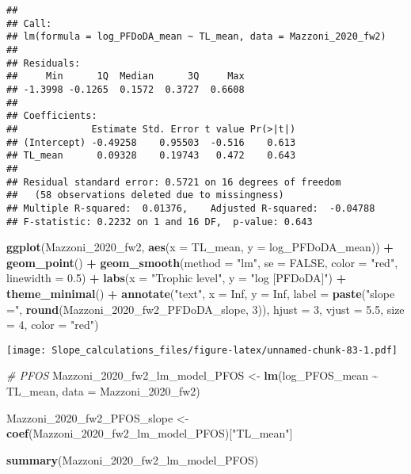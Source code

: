 \documentclass[
]{article}
\newenvironment{Shaded}{\begin{snugshade}}{\end{snugshade}}
\newcommand{\AttributeTok}[1]{\textcolor[rgb]{0.13,0.29,0.53}{#1}}
\newcommand{\CommentTok}[1]{\textcolor[rgb]{0.56,0.35,0.01}{\textit{#1}}}
\newcommand{\ConstantTok}[1]{\textcolor[rgb]{0.56,0.35,0.01}{#1}}
\newcommand{\DecValTok}[1]{\textcolor[rgb]{0.00,0.00,0.81}{#1}}
\newcommand{\FloatTok}[1]{\textcolor[rgb]{0.00,0.00,0.81}{#1}}
\newcommand{\FunctionTok}[1]{\textcolor[rgb]{0.13,0.29,0.53}{\textbf{#1}}}
\newcommand{\NormalTok}[1]{#1}
\newcommand{\OtherTok}[1]{\textcolor[rgb]{0.56,0.35,0.01}{#1}}
\newcommand{\SpecialCharTok}[1]{\textcolor[rgb]{0.81,0.36,0.00}{\textbf{#1}}}
\newcommand{\StringTok}[1]{\textcolor[rgb]{0.31,0.60,0.02}{#1}}
\begin{document}
\begin{verbatim}
## 
## Call:
## lm(formula = log_PFDoDA_mean ~ TL_mean, data = Mazzoni_2020_fw2)
## 
## Residuals:
##     Min      1Q  Median      3Q     Max 
## -1.3998 -0.1265  0.1572  0.3727  0.6608 
## 
## Coefficients:
##             Estimate Std. Error t value Pr(>|t|)
## (Intercept) -0.49258    0.95503  -0.516    0.613
## TL_mean      0.09328    0.19743   0.472    0.643
## 
## Residual standard error: 0.5721 on 16 degrees of freedom
##   (58 observations deleted due to missingness)
## Multiple R-squared:  0.01376,    Adjusted R-squared:  -0.04788 
## F-statistic: 0.2232 on 1 and 16 DF,  p-value: 0.643
\end{verbatim}

\begin{Shaded}
\begin{Highlighting}[]
\FunctionTok{ggplot}\NormalTok{(Mazzoni\_2020\_fw2, }\FunctionTok{aes}\NormalTok{(}\AttributeTok{x =}\NormalTok{ TL\_mean, }\AttributeTok{y =}\NormalTok{ log\_PFDoDA\_mean)) }\SpecialCharTok{+}
  \FunctionTok{geom\_point}\NormalTok{() }\SpecialCharTok{+}
  \FunctionTok{geom\_smooth}\NormalTok{(}\AttributeTok{method =} \StringTok{"lm"}\NormalTok{, }\AttributeTok{se =} \ConstantTok{FALSE}\NormalTok{, }\AttributeTok{color =} \StringTok{"red"}\NormalTok{, }\AttributeTok{linewidth =} \FloatTok{0.5}\NormalTok{) }\SpecialCharTok{+}
  \FunctionTok{labs}\NormalTok{(}\AttributeTok{x =} \StringTok{"Trophic level"}\NormalTok{,}
       \AttributeTok{y =} \StringTok{"log [PFDoDA]"}\NormalTok{) }\SpecialCharTok{+}
  \FunctionTok{theme\_minimal}\NormalTok{() }\SpecialCharTok{+}
  \FunctionTok{annotate}\NormalTok{(}\StringTok{"text"}\NormalTok{, }\AttributeTok{x =} \ConstantTok{Inf}\NormalTok{, }\AttributeTok{y =} \ConstantTok{Inf}\NormalTok{, }\AttributeTok{label =} \FunctionTok{paste}\NormalTok{(}\StringTok{"slope ="}\NormalTok{, }\FunctionTok{round}\NormalTok{(Mazzoni\_2020\_fw2\_PFDoDA\_slope, }\DecValTok{3}\NormalTok{)), }
           \AttributeTok{hjust =} \DecValTok{3}\NormalTok{, }\AttributeTok{vjust =} \FloatTok{5.5}\NormalTok{, }\AttributeTok{size =} \DecValTok{4}\NormalTok{, }\AttributeTok{color =} \StringTok{"red"}\NormalTok{)}
\end{Highlighting}
\end{Shaded}

\texttt{[image: Slope\_calculations\_files/figure-latex/unnamed-chunk-83-1.pdf]}

\begin{Shaded}
\begin{Highlighting}[]
\CommentTok{\# PFOS}
\NormalTok{Mazzoni\_2020\_fw2\_lm\_model\_PFOS }\OtherTok{\textless{}{-}} \FunctionTok{lm}\NormalTok{(log\_PFOS\_mean }\SpecialCharTok{\textasciitilde{}}\NormalTok{ TL\_mean,}
                                      \AttributeTok{data =}\NormalTok{ Mazzoni\_2020\_fw2)}

\NormalTok{Mazzoni\_2020\_fw2\_PFOS\_slope }\OtherTok{\textless{}{-}} \FunctionTok{coef}\NormalTok{(Mazzoni\_2020\_fw2\_lm\_model\_PFOS)[}\StringTok{"TL\_mean"}\NormalTok{]}

\FunctionTok{summary}\NormalTok{(Mazzoni\_2020\_fw2\_lm\_model\_PFOS)}
\end{Highlighting}
\end{Shaded}
\end{document}
